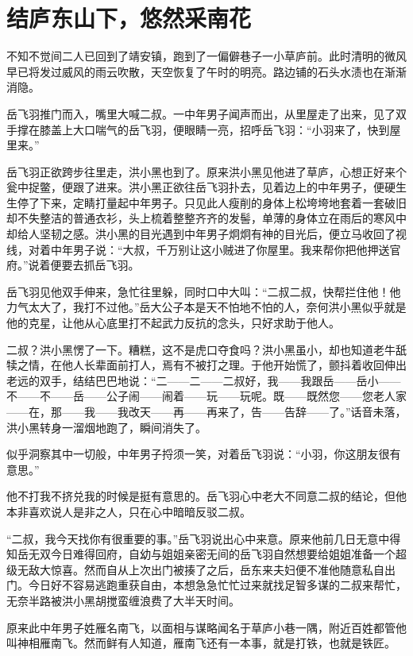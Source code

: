 \chapter{结庐东山下，悠然采南花}
\label{chap:cai-ju-dong-nan-xia}

不知不觉间二人已回到了靖安镇，跑到了一偏僻巷子一小草庐前。此时清明的微风早已将发过威风的雨云吹散，天空恢复了午时的明亮。路边铺的石头水渍也在渐渐消隐。

岳飞羽推门而入，嘴里大喊二叔。一中年男子闻声而出，从里屋走了出来，见了双手撑在膝盖上大口喘气的岳飞羽，便眼睛一亮，招呼岳飞羽：“小羽来了，快到屋里来。”

岳飞羽正欲跨步往里走，洪小黑也到了。原来洪小黑见他进了草庐，心想正好来个瓮中捉鳖，便跟了进来。洪小黑正欲往岳飞羽扑去，见着边上的中年男子，便硬生生停了下来，定睛打量起中年男子。只见此人瘦削的身体上松垮垮地套着一套破旧却不失整洁的普通衣衫，头上梳着整整齐齐的发髻，单薄的身体立在雨后的寒风中却给人坚韧之感。洪小黑的目光遇到中年男子炯炯有神的目光后，便立马收回了视线，对着中年男子说：“大叔，千万别让这小贼进了你屋里。我来帮你把他押送官府。”说着便要去抓岳飞羽。

岳飞羽见他双手伸来，急忙往里躲，同时口中大叫：“二叔二叔，快帮拦住他！他力气太大了，我打不过他。”岳大公子本是天不怕地不怕的人，奈何洪小黑似乎就是他的克星，让他从心底里打不起武力反抗的念头，只好求助于他人。

二叔？洪小黑愣了一下。糟糕，这不是虎口夺食吗？洪小黑虽小，却也知道老牛舐犊之情，在他人长辈面前打人，焉有不被打之理。于他开始慌了，颤抖着收回伸出老远的双手，结结巴巴地说：“二------二------二叔好，我------我跟岳------岳小------不------不------岳------公子闹------闹着------玩------玩呢。既------既然您------您老人家------在，那------我------我改天------再------再来了，告------告辞------了。”话音未落，洪小黑转身一溜烟地跑了，瞬间消失了。

似乎洞察其中一切般，中年男子捋须一笑，对着岳飞羽说：“小羽，你这朋友很有意思。”

他不打我不挤兑我的时候是挺有意思的。岳飞羽心中老大不同意二叔的结论，但他本非喜欢说人是非之人，只在心中暗暗反驳二叔。

“二叔，我今天找你有很重要的事。”岳飞羽说出心中来意。原来他前几日无意中得知岳无双今日难得回府，自幼与姐姐亲密无间的岳飞羽自然想要给姐姐准备一个超级无敌大惊喜。然而自从上次出门被揍了之后，岳东来夫妇便不准他随意私自出门。今日好不容易逃跑重获自由，本想急急忙忙过来就找足智多谋的二叔来帮忙，无奈半路被洪小黑胡搅蛮缠浪费了大半天时间。

原来此中年男子姓雁名南飞，以面相与谋略闻名于草庐小巷一隅，附近百姓都管他叫神相雁南飞。然而鲜有人知道，雁南飞还有一本事，就是打铁，也就是铁匠。

